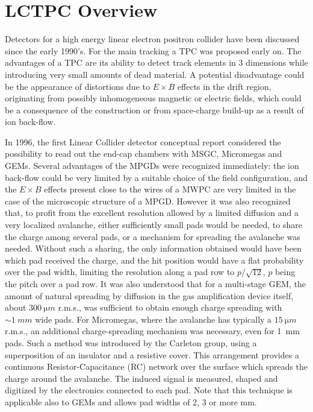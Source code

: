 \section{LCTPC Overview}
Detectors for a high energy linear electron positron collider have been discussed since the early 1990's. For the main tracking a TPC was proposed early on.
The advantages of a TPC are its ability to detect track elements in 3 dimensions while introducing very small amounts of dead material. A potential disadvantage could be the appearance of distortions due to $E \times B$ effects in the drift region, originating from possibly inhomogeneous magnetic or electric fields, which could be a consequence of the construction or from space-charge build-up as a result of ion back-flow.

In 1996, the first Linear Collider detector conceptual report \cite{Settles:1997wj} considered the possibility to read out the end-cap chambers with MSGC, Micromegas and GEMs. Several advantages of the MPGDs were recognized immediately: the ion back-flow could be very limited by a suitable choice of the field configuration, and the $E \times B$ effects present close to the wires of a MWPC are very limited in the case of the microscopic structure of a MPGD. However it was also recognized that, to profit from the
excellent resolution allowed by a limited diffusion and a very localized avalanche, either sufficiently small pads would be needed, to share the charge among several pads, or a mechanism for spreading the avalanche was needed. Without such a sharing, the only information obtained would have been which pad received the charge, and the hit position would have a flat probability over the pad width, limiting the resolution along a pad row to $p/\sqrt{12}$, $p$ being the pitch over a pad row. It was also
understood that for a multi-stage GEM, the amount of natural spreading by diffusion in the gas amplification device itself, about $\SI{300}{\micro m}$ r.m.s., was sufficient to obtain enough charge spreading with $\sim\SI{1}{mm}$ wide pads. For Micromegas, where the avalanche has typically a $\SI{15}{\micro m}$ r.m.s., an
additional charge-spreading mechanism was necessary, even for \SI{1}{mm} pads. Such a method was introduced by the Carleton group, using a superposition of an insulator and a resistive cover. This arrangement provides a continuous Resistor-Capacitance (RC) network over the surface which spreads the charge around the avalanche. The induced
signal is measured, shaped and digitized by the electronics connected to each pad. Note that this technique is applicable also to GEMs and allows pad widths of 2, 3 or more mm.


